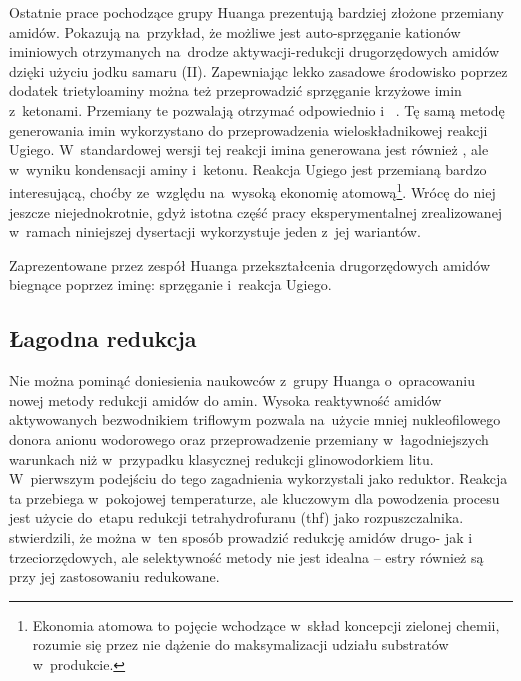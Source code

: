 Ostatnie prace pochodzące grupy Huanga prezentują bardziej złożone przemiany amidów.
Pokazują na~przykład, że możliwe jest auto-sprzęganie kationów iminiowych  otrzymanych na~drodze
  aktywacji-redukcji drugorzędowych amidów  dzięki użyciu jodku samaru (II).
Zapewniając lekko zasadowe środowisko poprzez dodatek trietyloaminy można też przeprowadzić
  sprzęganie krzyżowe imin  z~ketonami.
Przemiany te pozwalają otrzymać odpowiednio  
  i~ .
Tę samą metodę generowania imin wykorzystano do przeprowadzenia wieloskładnikowej reakcji Ugiego.
W~standardowej wersji tej reakcji imina  generowana jest również ,
  ale w~wyniku kondensacji aminy i~ketonu.
Reakcja Ugiego jest przemianą bardzo interesującą, choćby ze~względu na~wysoką ekonomię atomową\footnote{%
  Ekonomia atomowa to pojęcie wchodzące w~skład koncepcji zielonej chemii,
  rozumie się przez nie dążenie do maksymalizacji udziału substratów w~produkcie.
}.
Wrócę do niej jeszcze niejednokrotnie, gdyż istotna część pracy eksperymentalnej
  zrealizowanej w~ramach niniejszej dysertacji wykorzystuje jeden z~jej wariantów.
\begin{scheme*}
  \centering
  
  \caption{
    Zaprezentowane przez zespół Huanga przekształcenia drugorzędowych amidów biegnące poprzez iminę: sprzęganie i~reakcja Ugiego.
  }
  \label{sch:huang-ugi-diamine}
\end{scheme*}


\subsection{Łagodna redukcja}\label{literature:triflic:reduction}
Nie można pominąć doniesienia naukowców z~grupy Huanga o~opracowaniu nowej metody redukcji amidów do amin.
Wysoka reaktywność amidów aktywowanych bezwodnikiem triflowym pozwala na~użycie mniej nukleofilowego donora anionu wodorowego oraz
przeprowadzenie przemiany w~łagodniejszych warunkach niż w~przypadku klasycznej redukcji glinowodorkiem litu.
W~pierwszym podejściu do tego zagadnienia wykorzystali  jako reduktor.
Reakcja ta przebiega w~pokojowej temperaturze, ale
  kluczowym dla powodzenia procesu jest użycie do~etapu redukcji tetrahydrofuranu (\acrshort{thf}) jako rozpuszczalnika.
\citeauthor{xiang10} stwierdzili, że można w~ten sposób prowadzić redukcję amidów drugo- jak i trzeciorzędowych,
  ale selektywność metody nie jest idealna \--- estry również są przy jej zastosowaniu redukowane.

